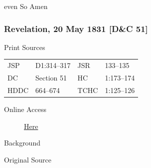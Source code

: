 				even So Amen
				
		\subsubsection{Revelation, 20 May 1831 [D\&C 51]}
			\label{EMS-1831-JS-20-MAY-1831}
		
			\begin{description}
				\item[Print Sources]
			\end{description}

				\begin{tabular}{p{0.5in}p{1in}p{0.5in}p{1in}}
				JSP	 	& D1:314--317	& JSR 		& 133--135 \\
				DC	 	& Section 51 	& HC 		& 1:173--174 \\
				HDDC 	& 664--674		& TCHC 		& 1:125--126 \\
				\end{tabular}
			
			\begin{description}
				\item[Online Access] \href{https://www.josephsmithpapers.org/paper-summary/revelation-20-may-1831-dc-51/1}{Here}
			\end{description}
			
			\begin{description}
				\item[Background]
			\end{description}
			
			
			\begin{description}
				\item[Original Source]
			\end{description}
			
			
